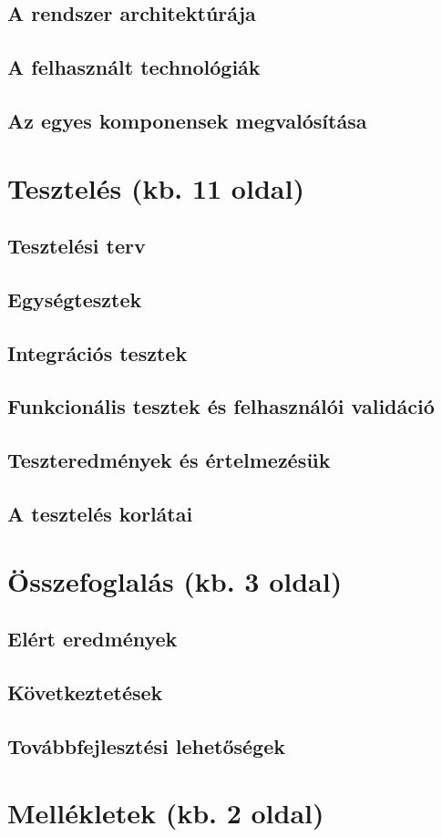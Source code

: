 \documentclass[12pt,a4paper]{article}
\begin{document}
\subsection{A rendszer architektúrája}
\subsection{A felhasznált technológiák}
\subsection{Az egyes komponensek megvalósítása}

\section{Tesztelés (kb. 11 oldal)}
\subsection{Tesztelési terv}
\subsection{Egységtesztek}
\subsection{Integrációs tesztek}
\subsection{Funkcionális tesztek és felhasználói validáció}
\subsection{Teszteredmények és értelmezésük}
\subsection{A tesztelés korlátai}

\section{Összefoglalás (kb. 3 oldal)}
\subsection{Elért eredmények}
\subsection{Következtetések}
\subsection{Továbbfejlesztési lehetőségek}

\section{Mellékletek (kb. 2 oldal)}
\end{document}
